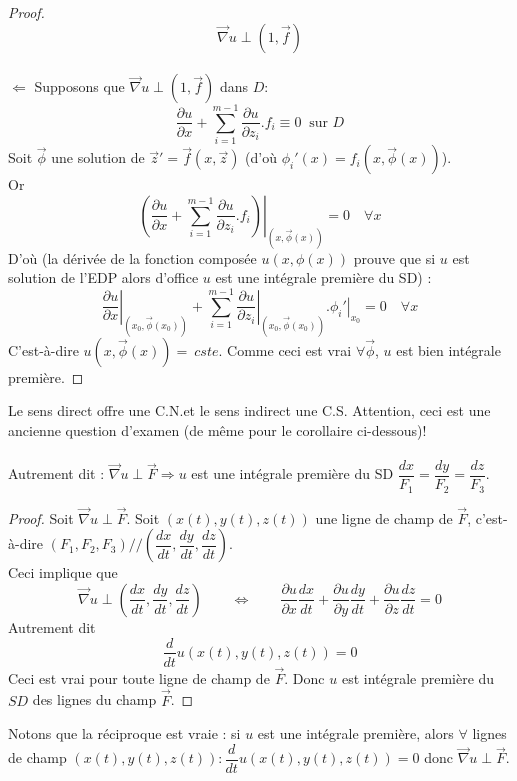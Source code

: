 \begin{proof}
\begin{equation}
	\vec\nabla u \perp (1,\vec{f})
	\end{equation}
	\ \\
	$\Longleftarrow$ Supposons que $\vec\nabla u \perp (1,\vec f)$ dans $D$:
	\begin{equation}
	\dfrac{\partial u}{\partial x}+\sum_{i=1}^{m-1}\dfrac{\partial u
	}{\partial z_i}.f_i\equiv 0\ \text{ sur } D
	\end{equation}
	Soit $\vec{\phi}$ une solution de $\vec{z}' = \vec{f}(x,\vec{z})$ (d'où 
	$\phi_i'(x) = f_i(x,\vec{\phi}(x))$).\\
	Or
	\begin{equation}
	\left.\left(\dfrac{\partial u}{\partial x}+\sum_{i=1}^{m-1}\dfrac{\partial u
	}{\partial z_i}.f_i\right)\right|_{(x,\vec{\phi}(x))} = 0\quad\forall x
	\end{equation}
	D'où (la dérivée de la fonction composée $u(x,\phi(x))$ prouve que si 
	$u$ est solution de l'EDP alors d'office $u$ est une intégrale première 
	du SD) :
	\begin{equation}
	\left.\dfrac{\partial u}{\partial x}\right|_{(x_0,\vec{\phi}(x_0))} + 
	\sum_{i=1}^{m-1}\left.\dfrac{\partial u}{\partial z_i}\right|_{(x_0,
	\vec{\phi}(x_0))}.\left.\phi_i'\right|_{x_0} = 0\quad \forall x
	\end{equation}
	C'est-à-dire $u(x,\vec{\phi}(x)) =\ cste$. Comme ceci est vrai $\forall 
	\vec{\phi}$, $u$ est bien intégrale première.
	\end{proof}
	Le sens direct offre une C.N.et le sens indirect une C.S. Attention, 
	ceci est une ancienne question d'examen (de même pour le corollaire 
	ci-dessous)!\\
	
	
	\ \\
	
	Autrement dit : $\vec\nabla u \perp\vec{F} \Longrightarrow u$ est une 
	intégrale première du SD $ \dfrac{dx}{F_1}=\dfrac{dy}{F_2}=\dfrac{dz}{F_3}$.
	
	\begin{proof}
	Soit $\vec{\nabla}u\perp \vec{F}$. Soit $(x(t),y(t),z(t))$ une ligne de 
	champ de $\vec{F}$, c'est-à-dire $(F_1,F_2,F_3)//\left(\dfrac{dx}{dt},
	\dfrac{dy}{dt},\dfrac{dz}{dt}\right)$.\\
	Ceci implique que 
	\begin{equation}
	\vec\nabla u \perp \left(\dfrac{dx}{dt},\dfrac{dy}{dt},\dfrac{dz}{dt}\right)
	\qquad \Leftrightarrow\qquad \dfrac{\partial u}{\partial x}\dfrac{dx}{dt}+
	\dfrac{\partial u}{\partial y}\dfrac{dy}{dt}+\dfrac{\partial u}{\partial z}
	\dfrac{dz}{dt} = 0
	\end{equation}
	Autrement dit
	\begin{equation}
	\dfrac{d}{dt}u(x(t),y(t),z(t)) = 0
	\end{equation}
	Ceci est vrai pour toute ligne de champ de $\vec{F}$. Donc $u$ est intégrale 
	première du $SD$ des lignes du champ $\vec{F}$.
	\end{proof}
	
	Notons que la réciproque est vraie : si $u$ est une intégrale première, alors 
	$\forall$ lignes de champ $(x(t),y(t),z(t)) : \dfrac{d}{dt}u(x(t),y(t),z(t)) 
	= 0$ donc $\vec{\nabla}u\perp\vec{F}$.